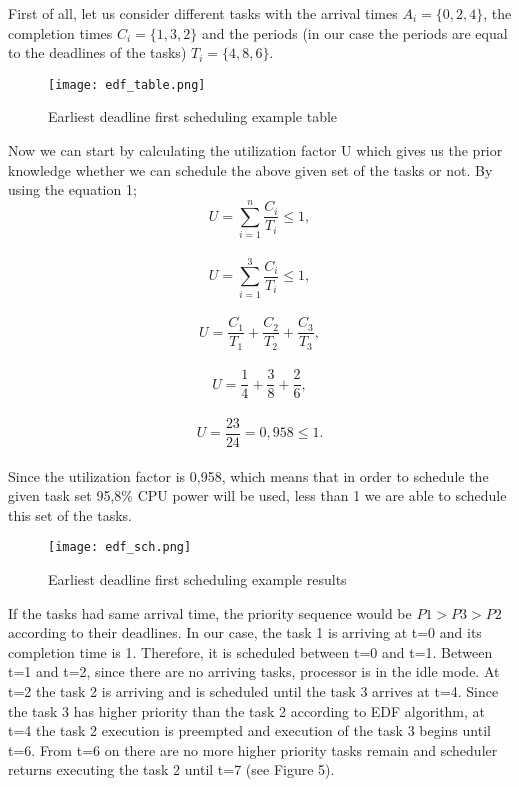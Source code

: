 \documentclass[conference]{IEEEtran}
\begin{document}
First of all, let us consider different tasks with the arrival times \( A_i = \{0, 2, 4\} \), the completion times \( C_i = \{1, 3, 2\}\) and the periods (in our case the periods are equal to the deadlines of the tasks) \( T_i = \{4, 8, 6\}\). \\

\begin{figure}[h]
    \centering
    \texttt{[image: edf\_table.png]}
    \caption{Earliest deadline first scheduling example table}
    \label{fig:ex1}
\end{figure}

Now we can start by calculating the utilization factor U which gives us the prior knowledge whether we can schedule the above given set of the tasks or not. By using the equation 1;\\
\[ U = \sum_{i=1}^n \frac{C_i}{T_i} \leq 1 ,\]\\
\[ U = \sum_{i=1}^3 \frac{C_i}{T_i} \leq 1 ,\]\\
\[ U = \frac{C_1}{T_1} + \frac{C_2}{T_2} + \frac{C_3}{T_3} ,\]\\
\[ U = \frac{1}{4} + \frac{3}{8} + \frac{2}{6},\]\\
\[ U = \frac{23}{24} = 0,958 \leq 1.\] \\

Since the utilization factor is 0,958, which means that in order to schedule the given task set 95,8\% CPU power will be used, less than 1 we are able to schedule this set of the tasks. \\

\begin{figure}[h]
    \centering
    \texttt{[image: edf\_sch.png]}
    \caption{Earliest deadline first scheduling example results}
    \label{fig:ex1}
\end{figure}

If the tasks had same arrival time, the priority sequence would be \(P1 > P3 > P2\) according to their deadlines. In our case, the task 1 is arriving at t=0 and its completion time is 1. Therefore, it is scheduled between t=0 and t=1. Between t=1 and t=2, since there are no arriving tasks, processor is in the idle mode. At t=2 the task 2 is arriving and is scheduled until the task 3 arrives at t=4. Since the task 3 has higher priority than the task 2 according to EDF algorithm, at t=4 the task 2 execution is preempted and execution of the task 3 begins until t=6. From t=6 on there are no more higher priority tasks remain and scheduler returns executing the task 2 until t=7 (see Figure 5).
\end{document}
